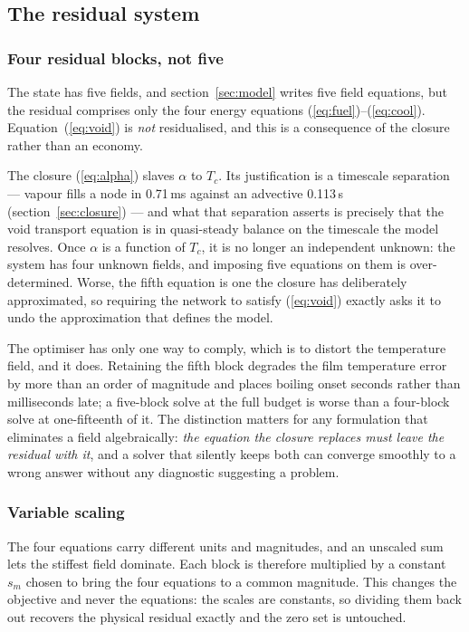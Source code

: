 \documentclass[11pt,a4paper]{article}
\begin{document}
\subsection{The residual system}\label{sec:residualsystem}

\subsubsection{Four residual blocks, not five}

The state has five fields, and section~\ref{sec:model} writes five field equations, but the
residual comprises only the four energy equations
(\ref{eq:fuel})--(\ref{eq:cool}). Equation~(\ref{eq:void}) is \emph{not} residualised, and
this is a consequence of the closure rather than an economy.

The closure (\ref{eq:alpha}) slaves $\alpha$ to $T_c$. Its justification is a timescale
separation --- vapour fills a node in 0.71\,ms against an advective 0.113\,s
(section~\ref{sec:closure}) --- and what that separation asserts is precisely that the void
transport equation is in quasi-steady balance on the timescale the model resolves. Once
$\alpha$ is a function of $T_c$, it is no longer an independent unknown: the system has four
unknown fields, and imposing five equations on them is over-determined. Worse, the fifth
equation is one the closure has deliberately approximated, so requiring the network to
satisfy (\ref{eq:void}) exactly asks it to undo the approximation that defines the model.

The optimiser has only one way to comply, which is to distort the temperature field, and it
does. Retaining the fifth block degrades the film temperature error by more than an order
of magnitude and places boiling onset seconds rather than milliseconds late; a five-block
solve at the full budget is worse than a four-block solve at one-fifteenth of it. The distinction matters for any formulation that eliminates a field algebraically:
\emph{the equation the closure replaces must leave the residual with it}, and a solver
that silently keeps both can converge smoothly to a wrong answer without any diagnostic
suggesting a problem.

\subsubsection{Variable scaling}

The four equations carry different units and magnitudes, and an unscaled sum lets the
stiffest field dominate. Each block is therefore multiplied by a constant $s_m$ chosen to
bring the four equations to a common magnitude. This changes the objective and never the
equations: the scales are constants, so dividing them back out recovers the physical
residual exactly and the zero set is untouched.
\end{document}
